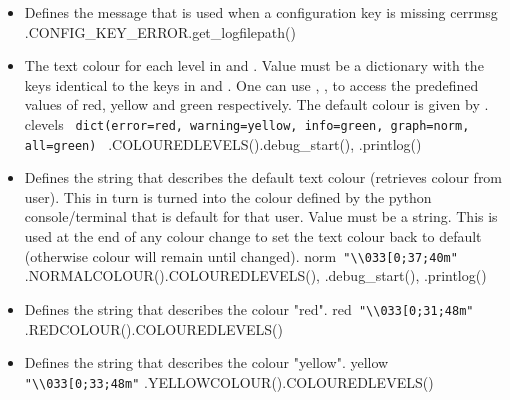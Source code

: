 \begin{itemize}
\ifdevguide
\item {}
{Defines the message that is used when a configuration key is missing}
{cerrmsg}
{\AllRecipes}{\spirouConst.CONFIG\_KEY\_ERROR}{\spirouLog.get\_logfilepath()}
\fi

\ifdevguide
\item {} 
{The text colour for each level in  and . Value must be a dictionary with the keys identical to the keys in  and . One can use , ,  to access the predefined values of red, yellow and green respectively. The default colour is given by .}
{clevels}
{\lstinline[style=pythoninline]| dict(error=red, warning=yellow, info=green, graph=norm, all=green) |}
{\AllRecipes}{\spirouConst.COLOUREDLEVELS()}{\spirouLog.debug\_start(), \spirouLog.printlog()}
\fi

\ifdevguide
\item {} 
{Defines the string that describes the default text colour (retrieves colour from user). This in turn is turned into the colour defined by the python console/terminal that is default for that user. Value must be a string. This is used at the end of any colour change to set the text colour back to default (otherwise colour will remain until changed).}
{norm}{\lstinline[style=pythoninline]| "\\033[0;37;40m"|}
{\AllRecipes}{\spirouConst.NORMALCOLOUR()}{\spirouConst.COLOUREDLEVELS(), \spirouLog.debug\_start(), \spirouLog.printlog()}
\fi

\ifdevguide
\item {} 
{Defines the string that describes the colour "red".}
{red}{\lstinline[style=pythoninline]| "\\033[0;31;48m"|}
{\AllRecipes}{\spirouConst.REDCOLOUR()}{\spirouConst.COLOUREDLEVELS()}
\fi

\ifdevguide
\item {} 
{Defines the string that describes the colour "yellow".}
{yellow}{\lstinline[style=pythoninline]| "\\033[0;33;48m"|}
{\AllRecipes}{\spirouConst.YELLOWCOLOUR()}{\spirouConst.COLOUREDLEVELS()}
\fi


\end{itemize}
